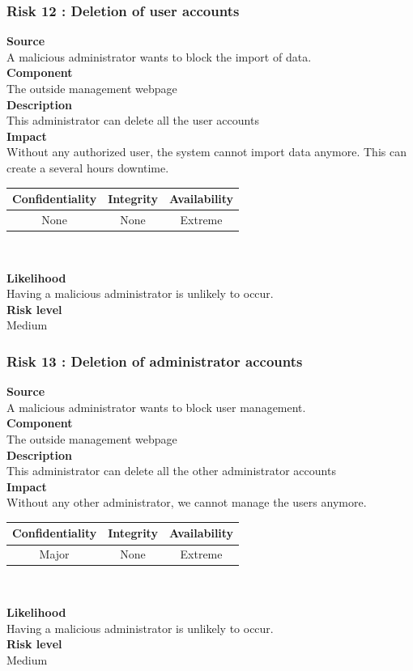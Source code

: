 \documentclass[a4paper,11pt]{article}
\begin{document}
\subsubsection{Risk 12 : Deletion of user accounts }
\textbf{Source} \\A malicious administrator wants to block the import of data.\\
\textbf{Component} \\The outside management webpage\\
\textbf{Description}\\This administrator can delete all the user accounts \\
\textbf{Impact}\\
Without any authorized user, the system cannot import data anymore. This can create a several hours downtime. \\
\begin{center}
\begin{tabular}{|c|c|c|}
\hline
\textbf{Confidentiality} & \textbf{Integrity} & \textbf{Availability} \\
\hline
None & None & Extreme \\
\hline
\end{tabular}\\
\end{center}
\textbf{Likelihood}\\ Having a malicious administrator is unlikely to occur.\\
\textbf{Risk level}\\Medium\\

\subsubsection{Risk 13 : Deletion of administrator accounts }
\textbf{Source} \\A malicious administrator wants to block user management.\\
\textbf{Component} \\The outside management webpage\\
\textbf{Description}\\This administrator can delete all the other administrator accounts \\
\textbf{Impact}\\
Without any other administrator, we cannot manage the users anymore.\\
\begin{center}
\begin{tabular}{|c|c|c|}
\hline
\textbf{Confidentiality} & \textbf{Integrity} & \textbf{Availability} \\
\hline
Major & None & Extreme \\
\hline
\end{tabular}\\
\end{center}
\textbf{Likelihood}\\ Having a malicious administrator is unlikely to occur.\\
\textbf{Risk level}\\Medium\\
\end{document}
